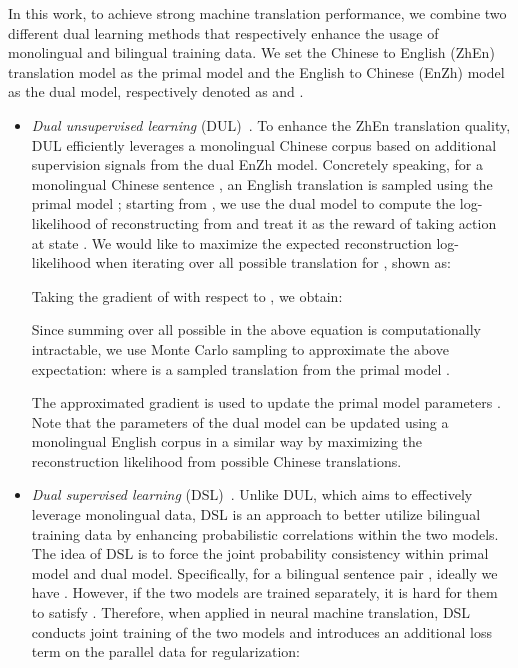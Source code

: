 \documentclass[a4paper]{article}
\begin{document}
\begin{CJK*}{UTF8}{gbsn}
In this work, to achieve strong machine translation performance, we combine two different dual learning methods that respectively enhance the usage of monolingual and bilingual training data. We set the Chinese to English (ZhEn) translation model as the primal model and the English to Chinese (EnZh) model as the dual model, respectively denoted as  and .

\begin{itemize}
\item \emph{Dual unsupervised learning} (DUL)~\cite{dualNMT}. To enhance the ZhEn translation quality, DUL efficiently leverages a monolingual Chinese corpus based on additional supervision signals from the dual EnZh model. Concretely speaking, for a monolingual Chinese sentence , an English translation  is sampled using the primal model ; starting from , we use the dual model  to compute the log-likelihood  of reconstructing  from  and treat it as the reward of taking action  at state . We would like to maximize the expected reconstruction log-likelihood when iterating over all possible translation  for , shown as:



Taking the gradient of  with respect to , we obtain:


Since summing over all possible  in the above equation is computationally intractable, we use Monte Carlo sampling to approximate the above expectation:
 where  is a sampled translation from the primal model . 



The approximated gradient is used to update the primal model parameters . 
Note that the parameters of the dual model  can be updated using a monolingual English corpus in a similar way by maximizing the reconstruction likelihood from possible Chinese translations. 

\item \emph{Dual supervised learning} (DSL)~\cite{DSL}. Unlike DUL, which aims to effectively leverage monolingual data, DSL is an approach to better utilize bilingual training data by enhancing probabilistic correlations within the two models. The idea of DSL is to force the joint probability consistency within primal model and dual model. Specifically, for a bilingual sentence pair , ideally we have . However, if the two models are trained separately, it is hard for them to satisfy . Therefore, when applied in neural machine translation, DSL conducts joint training of the two models and introduces an additional loss term on the parallel data  for regularization:


\end{itemize}
\end{CJK*}
\end{document}
